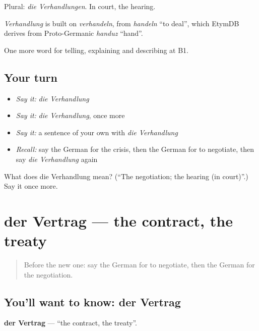 Plural: \emph{die Verhandlungen}. In court, the hearing.

\begin{cousinweb}
\emph{Verhandlung} is built on \emph{verhandeln}, from \emph{handeln} \textquotedblleft{}to deal\textquotedblright{}, which EtymDB derives from Proto-Germanic \emph{handuz} \textquotedblleft{}hand\textquotedblright{}.
\end{cousinweb}

\begin{grammarlens}[title={What you've built}]
One more word for telling, explaining and describing at B1.
\end{grammarlens}

\subsection*{Your turn}
\begin{itemize}
\raggedright
  \item \emph{Say it:} \emph{die Verhandlung}
  \item \emph{Say it:} \emph{die Verhandlung}, once more
  \item \emph{Say it:} a sentence of your own with \emph{die Verhandlung}
  \item \emph{Recall:} say the German for the crisis, then the German for to negotiate, then say \emph{die Verhandlung} again
\end{itemize}

\begin{tcolorbox}[breakable,colback=teal!4,colframe=teal!35!black,title={Before you move on}]
What does die Verhandlung mean? (\textquotedblleft{}The negotiation; the hearing (in court)\textquotedblright{}.) Say it once more.
\end{tcolorbox}
\section[der Vertrag]{der Vertrag — the contract, the treaty}

\label{lesson:GE-C278-vertrag}



\begin{quote}
Before the new one: say the German for to negotiate, then the German for the negotiation.
\end{quote}

\subsection*{You'll want to know: der Vertrag}
\textbf{der Vertrag} — \textquotedblleft{}the contract, the treaty\textquotedblright{}.

